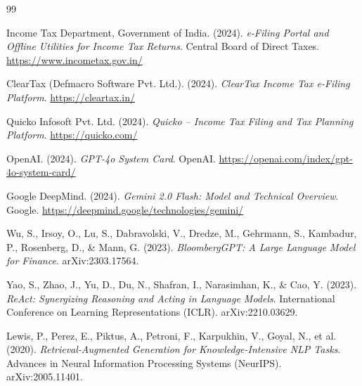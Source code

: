 \documentclass[12pt, a4paper, oneside]{report}
\begin{document}

\begin{thebibliography}{99}

%

Income Tax Department, Government of India. (2024). \textit{e-Filing Portal and
Offline Utilities for Income Tax Returns}. Central Board of Direct Taxes.
\url{https://www.incometax.gov.in/}

ClearTax (Defmacro Software Pvt. Ltd.). (2024). \textit{ClearTax Income Tax
e-Filing Platform}. \url{https://cleartax.in/}

Quicko Infosoft Pvt. Ltd. (2024). \textit{Quicko -- Income Tax Filing and Tax
Planning Platform}. \url{https://quicko.com/}

OpenAI. (2024). \textit{GPT-4o System Card}. OpenAI.
\url{https://openai.com/index/gpt-4o-system-card/}

Google DeepMind. (2024). \textit{Gemini 2.0 Flash: Model and Technical
Overview}. Google.
\url{https://deepmind.google/technologies/gemini/}

Wu, S., Irsoy, O., Lu, S., Dabravolski, V., Dredze, M., Gehrmann, S., Kambadur,
P., Rosenberg, D., \& Mann, G. (2023). \textit{BloombergGPT: A Large Language
Model for Finance}. arXiv:2303.17564.

Yao, S., Zhao, J., Yu, D., Du, N., Shafran, I., Narasimhan, K., \& Cao, Y.
(2023). \textit{ReAct: Synergizing Reasoning and Acting in Language Models}.
International Conference on Learning Representations (ICLR). arXiv:2210.03629.

Lewis, P., Perez, E., Piktus, A., Petroni, F., Karpukhin, V., Goyal, N., et al.
(2020). \textit{Retrieval-Augmented Generation for Knowledge-Intensive NLP
Tasks}. Advances in Neural Information Processing Systems (NeurIPS).
arXiv:2005.11401.


\end{thebibliography}
\end{document}

